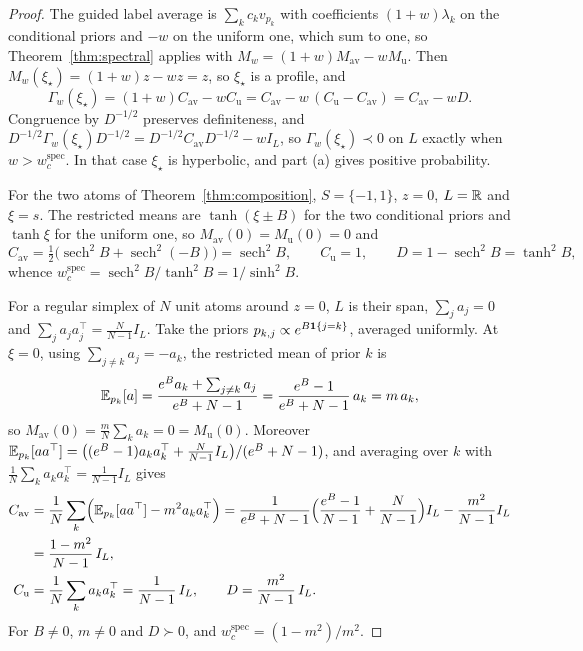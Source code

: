 \documentclass{article} %
\makeatletter
\newif\ificlr
\newcommand{\placeblock}[1]{\ificlr\@nameuse{moved@#1}\fi}
\newcommand{\iclrbr}{\\&}\newcommand{\iclrbrq}{\\&\qquad}\newcommand{\iclrqbr}{\\&}
\newcommand{\iclrbr}{}\newcommand{\iclrbrq}{}\newcommand{\iclrqbr}{\qquad}
\theoremstyle{plain}
\theoremstyle{definition}
\theoremstyle{remark}
\makeatother
\begin{document}
\ificlr\placeblock{corspectral}\else\corspectral*\fi
\begin{proof}
The guided label average is $\sum_kc_kv_{p_k}$ with coefficients $(1+w)\lambda_k$ on the
conditional priors and $-w$ on the uniform one, which sum to one, so Theorem~\ref{thm:spectral}
applies with $M_w=(1+w)M_{\mathrm{av}}-wM_{\mathrm u}$. Then $M_w(\xi_\star)=(1+w)z-wz=z$, so
$\xi_\star$ is a profile, and
\[
\Gamma_w(\xi_\star)=(1+w)C_{\mathrm{av}}-wC_{\mathrm u}=C_{\mathrm{av}}-w\,(C_{\mathrm u}-C_{\mathrm{av}})
=C_{\mathrm{av}}-wD .
\]
Congruence by $D^{-1/2}$ preserves definiteness, and
$D^{-1/2}\Gamma_w(\xi_\star)D^{-1/2}=D^{-1/2}C_{\mathrm{av}}D^{-1/2}-wI_L$, so $\Gamma_w(\xi_\star)\prec0$
on $L$ exactly when $w>w_c^{\mathrm{spec}}$. In that case $\xi_\star$ is hyperbolic, and part (a)
gives positive probability.

For the two atoms of Theorem~\ref{thm:composition}, $S=\{-1,1\}$, $z=0$, $L=\mathbb{R}$ and $\xi=s$. The
restricted means are $\tanh(\xi\pm B)$ for the two conditional priors and $\tanh\xi$ for the uniform
one, so $M_{\mathrm{av}}(0)=M_{\mathrm u}(0)=0$ and
\[
C_{\mathrm{av}}=\tfrac12\bigl(\operatorname{sech}^2B+\operatorname{sech}^2(-B)\bigr)=\operatorname{sech}^2B,
\qquad C_{\mathrm u}=1,\qquad D=1-\operatorname{sech}^2B=\tanh^2B,
\]
whence $w_c^{\mathrm{spec}}=\operatorname{sech}^2B/\tanh^2B=1/\sinh^2B$.

For a regular simplex of $N$ unit atoms around $z=0$, $L$ is their span, $\sum_ja_j=0$ and
$\sum_ja_ja_j^\top=\frac{N}{N-1}I_L$. Take the priors $p_{k,j}\propto e^{B\mathbf{1}\{j=k\}}$, averaged
uniformly. At $\xi=0$, using $\sum_{j\ne k}a_j=-a_k$, the restricted mean of prior $k$ is
\[
\mathbb{E}_{p_k}[a]=\frac{e^Ba_k+\sum_{j\ne k}a_j}{e^B+N-1}=\frac{e^B-1}{e^B+N-1}\,a_k=m\,a_k ,
\]
so $M_{\mathrm{av}}(0)=\frac mN\sum_ka_k=0=M_{\mathrm u}(0)$. Moreover
$\mathbb{E}_{p_k}[aa^\top]=\bigl((e^B-1)a_ka_k^\top+\frac{N}{N-1}I_L\bigr)/(e^B+N-1)$, and averaging over $k$
with $\frac1N\sum_ka_ka_k^\top=\frac1{N-1}I_L$ gives
\begin{align*}
C_{\mathrm{av}}&=\frac1N\sum_k\Bigl(\E_{p_k}[aa^\top]-m^2a_ka_k^\top\Bigr)
=\frac{1}{e^B+N-1}\Bigl(\frac{e^B-1}{N-1}+\frac{N}{N-1}\Bigr)I_L-\frac{m^2}{N-1}I_L
\iclrbr=\frac{1-m^2}{N-1}\,I_L,\\
C_{\mathrm u}&=\frac1N\sum_ka_ka_k^\top=\frac1{N-1}\,I_L,\qquad D=\frac{m^2}{N-1}\,I_L .
\end{align*}
For $B\ne0$, $m\ne0$ and $D\succ0$, and $w_c^{\mathrm{spec}}=(1-m^2)/m^2$.
\end{proof}
\end{document}
